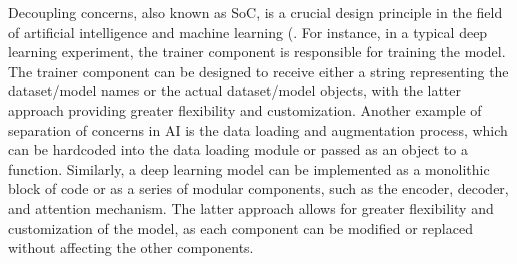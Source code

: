Decoupling concerns, also known as SoC, is a crucial design principle in the field of artificial intelligence and machine learning (\cite{mo2016decoupling,qian2006decoupling, pressman2010software}. For instance, in a typical deep learning experiment, the trainer component is responsible for training the model. The trainer component can be designed to receive either a string representing the dataset/model names or the actual dataset/model objects, with the latter approach providing greater flexibility and customization. Another example of separation of concerns in AI is the data loading and augmentation process, which can be hardcoded into the data loading module or passed as an object to a function. Similarly, a deep learning model can be implemented as a monolithic block of code or as a series of modular components, such as the encoder, decoder, and attention mechanism. The latter approach allows for greater flexibility and customization of the model, as each component can be modified or replaced without affecting the other components.











